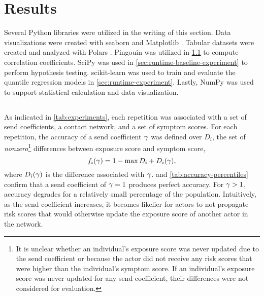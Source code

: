 \section{Results}\label{sec:results}

Several Python libraries were utilized in the writing of this section. Data visualizations were created with seaborn \citep{Waskom2021} and Matplotlib \citep{Hunter2007}. Tabular datasets were created and analyzed with Polars \citep{Vink2024}. Pingouin \citep{Vallat2018} was utilized in \cref{sec:parameters-experiment} to compute correlation coefficients. SciPy \citep{Virtanen2020} was used in \cref{sec:runtime-baseline-experiment} to perform hypothesis testing. scikit-learn \citep{Pedregosa20211} was used to train and evaluate the quantile regression models in \cref{sec:runtime-experiment}. Lastly, NumPy \citep{Harris2020} was used to support statistical calculation and data visualization.

\subsection{}\label{sec:parameters-experiment}

As indicated in \cref{tab:experiments}, each repetition was associated with a set of send coefficients, a contact network, and a set of symptom scores. For each repetition, the accuracy of a send coefficient $\gamma$ was defined over $D_i$, the set of \emph{nonzero}\footnote{It is unclear whether an individual's exposure score was never updated due to the send coefficient or because the actor did not receive any risk scores that were higher than the individual's symptom score. If an individual's exposure score was never updated for any send coefficient, their differences were not considered for evaluation.} differences between  exposure score and symptom score,
\begin{equation*}
  f_i(\gamma) = 1 - \max D_i + D_i(\gamma),
\end{equation*}
where $D_i(\gamma)$ is the difference associated with $\gamma$.  and \cref{tab:accuracy-percentiles} confirm that a send coefficient of $\gamma = 1$ produces perfect accuracy. For $\gamma > 1$, accuracy degrades for a relatively small percentage of the population. Intuitively, as the send coefficient increases, it becomes likelier for actors to not propagate risk scores that would otherwise update the exposure score of another actor in the network. 

